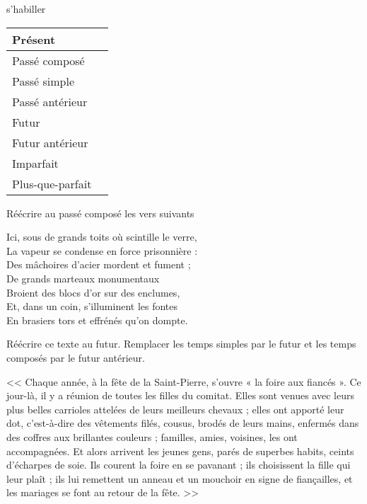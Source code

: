 \documentclass["../Cours.tex"]{subfiles}
\begin{document}
\begin{questions}
    \question s'habiller
    \begin{center}
        \begin{tabularx}{\linewidth}{|l|X|}\hline
            Présent &  \\\hline
            Passé composé & \\\hline
            Passé simple & \\\hline
            Passé antérieur & \\\hline
            Futur & \\\hline
            Futur antérieur & \\\hline
            Imparfait & \\\hline
            Plus-que-parfait & \\\hline
        \end{tabularx}
    \end{center}

    \clearpage
    \exercice Réécrire au passé composé les vers suivants
    \begin{center}
        Ici, sous de grands toits où scintille le verre,\\
        La vapeur se condense en force prisonnière :\\
        Des mâchoires d'acier mordent et fument ;\\
        De grands marteaux monumentaux\\
        Broient des blocs d'or sur des enclumes,\\
        Et, dans un coin, s'illuminent les fontes\\
        En brasiers tors et effrénés qu'on dompte. \\
    \end{center}

    \exercice Réécrire ce texte au futur. Remplacer les temps simples par le futur et les temps composés par le futur antérieur.

    << Chaque année, à la fête de la Saint-Pierre, s'ouvre « la foire aux fiancés ». Ce jour-là, il y a réunion de toutes les filles du comitat. Elles sont venues avec leurs plus belles carrioles attelées de leurs meilleurs chevaux ; elles ont apporté leur dot, c'est-à-dire des vêtements filés, cousus, brodés de leurs mains, enfermés dans des coffres aux brillantes couleurs ; familles, amies, voisines, les ont accompagnées. Et alors arrivent les jeunes gens, parés de superbes habits, ceints d'écharpes de soie. Ils courent la foire en se pavanant ; ils choisissent la fille qui leur plaît ; ils lui remettent un anneau et un mouchoir en signe de fiançailles, et les mariages se font au retour de la fête. >>


\end{questions}
\end{document}
